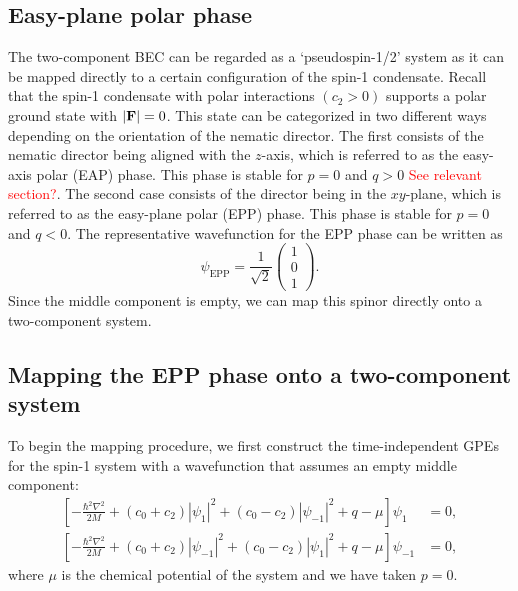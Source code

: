 \subsection{Easy-plane polar phase}
The two-component BEC can be regarded as a `pseudospin-1/2' system as it can be
mapped directly to a certain configuration of the spin-1 condensate.
Recall that the spin-1 condensate with polar interactions $(c_2 > 0)$ supports a
polar ground state with $|\vb{F}|=0$.
This state can be categorized in two different ways depending on the orientation
of the nematic director.
The first consists of the nematic director being aligned with the $z$-axis,
which is referred to as the easy-axis polar (EAP) phase.
This phase is stable for $p=0$ and $q>0$ \textcolor{red}{See relevant section?}.
The second case consists of the director being in the $xy$-plane, which is
referred to as the easy-plane polar (EPP) phase.
This phase is stable for $p=0$ and $q<0$.
The representative wavefunction for the EPP phase can be written as
\begin{equation}
    \psi_\mathrm{EPP} = \frac{1}{\sqrt{2}}\begin{pmatrix}
        1 \\ 0 \\ 1
    \end{pmatrix}.
    \label{eq:EPP_wavefunction}
\end{equation}
Since the middle component is empty, we can map this spinor directly onto a
two-component system.

\subsection{Mapping the EPP phase onto a two-component system}
To begin the mapping procedure, we first construct the time-independent
GPEs for the spin-1 system with a wavefunction that assumes an empty middle
component:
\begin{equation}
    \begin{aligned}
        \left[-\frac{\hbar^2\nabla^2}{2M}
        + (c_0 + c_2)|\psi_1|^2 + (c_0 - c_2)|\psi_{-1}|^2 
        + q - \mu\right]\psi_1 &= 0, \\
        \left[-\frac{\hbar^2\nabla^2}{2M}
        + (c_0 + c_2)|\psi_{-1}|^2 + (c_0 - c_2)|\psi_1|^2 
        + q - \mu\right]\psi_{-1} &= 0,
    \end{aligned}
    \label{eq:EPP-time-independent-GPEs}
\end{equation}
where $\mu$ is the chemical potential of the system and we have taken $p=0$.

